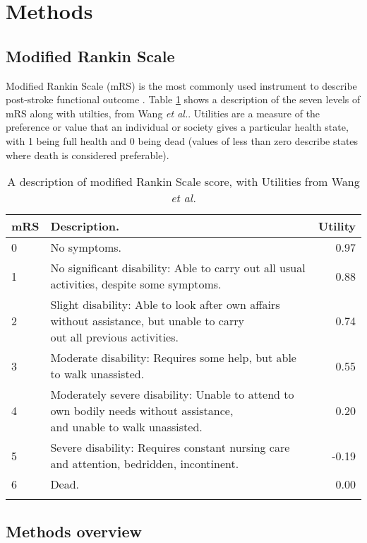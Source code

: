 \section{Methods}

\subsection{Modified Rankin Scale}

Modified Rankin Scale (mRS) is the most commonly used instrument to describe post-stroke functional outcome \cite{quinn_functional_2009}. Table \ref{tab:mrs} shows a description of the seven levels of mRS along with utilties, from Wang \emph{et al.}\cite{wang_utility-weighted_2020}. Utilities are a measure of the preference or value that an individual or society gives a particular health state, with 1 being full health and 0 being dead (values of less than zero describe states where death is considered preferable).




\renewcommand*{\arraystretch}{1.5} %

\begin{longtable}[]{@{}llr@{}}
\caption{A description of modified Rankin Scale score, with Utilities from Wang \emph{et al.}\cite{wang_utility-weighted_2020}}\\
\toprule
mRS & Description. & Utility\tabularnewline
\midrule
\endhead
0 & No symptoms. & 0.97\tabularnewline
1 & No significant disability: Able to carry out all usual activities,
despite some symptoms. & 0.88\tabularnewline
2 & \makecell[l]{Slight disability: Able to look after own affairs without assistance, but unable to carry \\ out all previous activities.} &
0.74\tabularnewline
3 & Moderate disability: Requires some help, but able to walk
unassisted. & 0.55\tabularnewline
4 & \makecell[l]{Moderately severe disability: Unable to attend to own bodily needs without assistance, \\ and unable to walk unassisted.} & 0.20\tabularnewline
5 & Severe disability: Requires constant nursing care and attention,
bedridden, incontinent. & -0.19\tabularnewline
6 & Dead. & 0.00\tabularnewline
\bottomrule
\label{tab:mrs}
\end{longtable}

\subsection{Methods overview}


